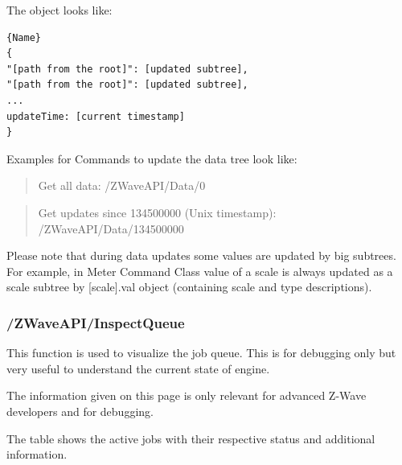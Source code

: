The object looks like:
\begin{lstlisting}[caption=JSON Data Structure]{Name}
{
"[path from the root]": [updated subtree],
"[path from the root]": [updated subtree],
...
updateTime: [current timestamp]
}
\end{lstlisting}

Examples for Commands to update the data tree look like:

\begin{quote}Get all data: /ZWaveAPI/Data/0\end{quote}

\begin{quote} Get updates since 134500000 (Unix timestamp): /ZWaveAPI/Data/134500000\end{quote}

Please note that during data updates some values are updated by big subtrees. For 
example, in Meter Command Class value of a scale is always updated as a scale 
subtree by [scale].val object (containing scale and type descriptions).


\subsubsection{/ZWaveAPI/InspectQueue}

This function is used to visualize the \zway job queue. This is for debugging only but 
very useful to understand the current state of \zway engine.

The information given on this page is only relevant for advanced Z-Wave developers and 
for debugging.

The table shows the active jobs with their respective status and additional information.

